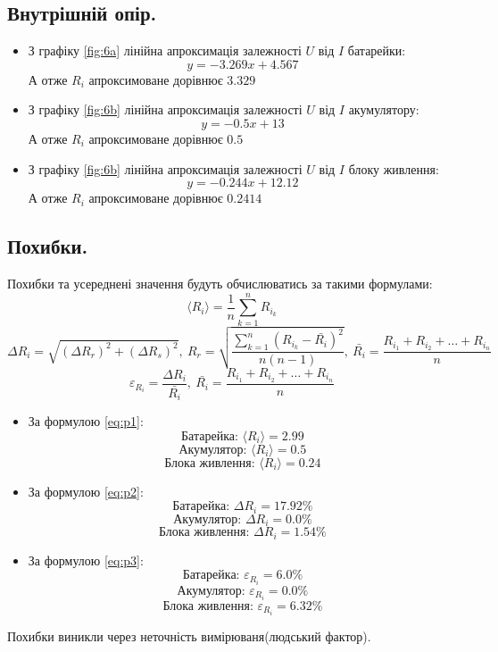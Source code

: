 \documentclass[a4paper,12pt]{article}
\begin{document}
\begin{justify}
	\subsection{Внутрішній опір.}
	\begin{itemize}
		\item З графіку \ref{fig:6a} лінійна апроксимація залежності $U$ від $I$ батарейки: $$y=-3.269 x + 4.567$$ А отже $R_i$ апроксимоване дорівнює $3.329$
		\item З графіку \ref{fig:6b} лінійна апроксимація залежності $U$ від $I$ акумулятору: $$y=-0.5 x + 13$$  А отже $R_i$ апроксимоване дорівнює $0.5$
		\item З графіку \ref{fig:6b} лінійна апроксимація залежності $U$ від $I$ блоку живлення: $$y=-0.244 x + 12.12$$ А отже $R_i$ апроксимоване дорівнює $0.2414$
	\end{itemize}\subsection{Похибки.}
	Похибки та усереднені значення будуть обчислюватись за такими формулами:
	\begin{equation}\label{eq:p1}
		\langle R_i\rangle=\dfrac1n\sum_{k=1}^{n}R_{i_k}
	\end{equation}
	\begin{equation}\label{eq:p2}
		\Delta R_i=\sqrt{(\Delta R_r)^2+(\Delta R_s)^2},\>R_r=\sqrt{\dfrac{\displaystyle\sum_{k=1}^{n}(R_{i_k}-\bar{R_i})^2}{n(n-1)}},\>\bar{R_i}=\dfrac{R_{i_1}+R_{i_2}+\dots+R_{i_n}}{n}
	\end{equation}	
	\begin{equation}\label{eq:p3}
		\varepsilon_{R_i}=\dfrac{\Delta R_i}{\bar{R_i}},\>\bar{R_i}=\dfrac{R_{i_1}+R_{i_2}+\dots+R_{i_n}}{n}
	\end{equation}
	\begin{itemize}
		\item За формулою \ref{eq:p1}: $$\textrm{Батарейка: }\langle R_i\rangle=2.99$$ $$\textrm{Акумулятор: }\langle R_i\rangle=0.5$$ $$\textrm{Блока живлення: }\langle R_i\rangle=0.24$$
		\item За формулою \ref{eq:p2}: $$\textrm{Батарейка: }\Delta R_i=17.92\%$$ $$\textrm{Акумулятор: }\Delta R_i=0.0\%$$ $$\textrm{Блока живлення: }\Delta R_i=1.54\%$$
		\item За формулою \ref{eq:p3}: $$\textrm{Батарейка: }\varepsilon_{R_i}=6.0\%$$ $$\textrm{Акумулятор: }\varepsilon_{R_i}=0.0\%$$ $$\textrm{Блока живлення: }\varepsilon_{R_i}=6.32\%$$
	\end{itemize}
	Похибки виникли через неточність вимірюваня(людський фактор). 
\newpage

\end{justify}
\end{document}
